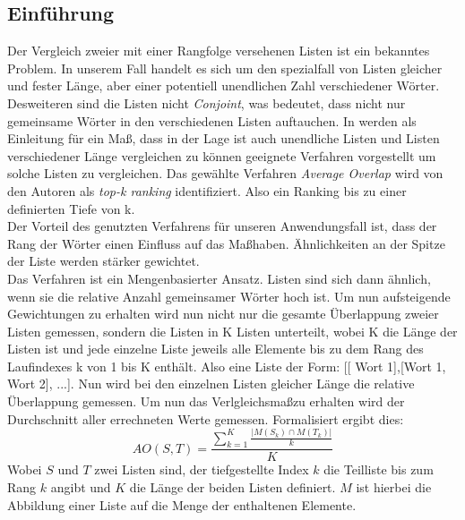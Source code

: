 \subsection{Einf\"uhrung}
Der Vergleich zweier mit einer Rangfolge versehenen Listen ist ein bekanntes Problem. In unserem Fall handelt es sich um den spezialfall von Listen gleicher und fester L\"ange, aber einer potentiell unendlichen Zahl verschiedener W\"orter. Desweiteren sind die Listen nicht \emph{Conjoint}, was bedeutet, dass nicht nur gemeinsame W\"orter in den verschiedenen Listen auftauchen. In \cite{webber2010similarity} werden als Einleitung f\"ur ein Ma\ss, dass in der Lage ist auch unendliche Listen und Listen verschiedener L\"ange vergleichen zu k\"onnen geeignete Verfahren vorgestellt um solche Listen zu vergleichen. Das gew\"ahlte Verfahren \emph{Average Overlap} wird von den Autoren als \emph{top-k ranking} identifiziert. Also ein Ranking bis zu einer definierten Tiefe von k.\\
Der Vorteil des genutzten Verfahrens f\"ur unseren Anwendungsfall ist, dass der Rang der W\"orter einen Einfluss auf das Ma\ss haben. \"Ahnlichkeiten an der Spitze der Liste werden st\"arker gewichtet.\\
Das Verfahren ist ein Mengenbasierter Ansatz. Listen sind sich dann \"ahnlich, wenn sie die relative Anzahl gemeinsamer W\"orter hoch ist. Um nun aufsteigende Gewichtungen zu erhalten wird nun nicht nur die gesamte \"Uberlappung zweier Listen gemessen, sondern die Listen in K Listen unterteilt, wobei K die L\"ange der Listen ist und jede einzelne Liste jeweils alle Elemente bis zu dem Rang des Laufindexes k von 1 bis K enth\"alt. Also eine Liste der Form: [[ Wort 1],[Wort 1, Wort 2], ...]. Nun wird bei den einzelnen Listen gleicher L\"ange die relative \"Uberlappung gemessen. Um nun das Verlgleichsma\ss  zu erhalten wird der Durchschnitt aller errechneten Werte gemessen.  Formalisiert ergibt dies:
\begin{equation}
AO(S,T) = \frac{\sum_{k=1}^K\frac{| M(S_k) \cap M(T_k)|}{k}}{K}
\end{equation}
Wobei $S$ und $T$ zwei Listen sind, der tiefgestellte Index $k$ die Teilliste bis zum Rang $k$ angibt und $K$ die L\"ange der beiden Listen definiert. $M$ ist hierbei die Abbildung einer Liste auf die Menge der enthaltenen Elemente.\\
